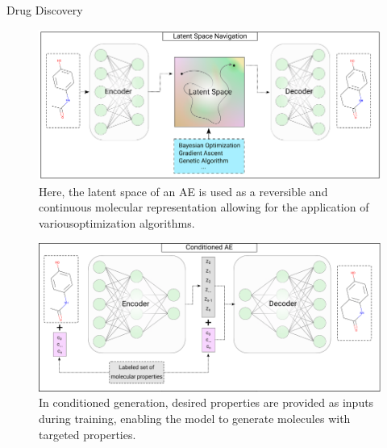 \begin{frame}[allowframebreaks]{Drug Discovery}
    \framebreak
    
    \begin{figure}
        \centering
        \includegraphics[height=0.75\textheight,width=1\textwidth,keepaspectratio]{images/science/drug-discovery-latent-space.png}
        \caption*{Here, the latent space of an AE is used as a reversible and continuous molecular representation allowing for the application of variousoptimization algorithms.}
    \end{figure}

    \framebreak
    
    \begin{figure}
        \centering
        \includegraphics[height=0.75\textheight,width=1\textwidth,keepaspectratio]{images/science/drug-discovery-conditioned-ae.png}
        \caption*{In conditioned generation, desired properties are provided as inputs during training, enabling the model to generate molecules with targeted properties.}  
    \end{figure}

    \framebreak
    

\end{frame}
